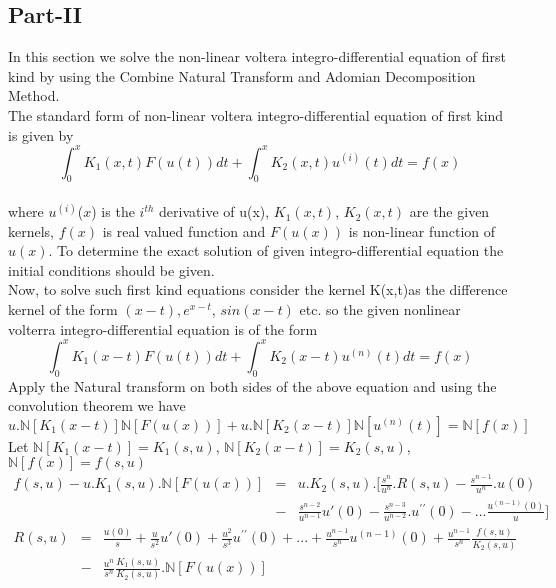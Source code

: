\subsection{Part-II}
        In this section we solve the non-linear voltera integro-differential equation of first kind by using the Combine Natural Transform and Adomian Decomposition Method.\\        
The standard form of non-linear voltera integro-differential equation of first kind is given by\cite{R92}
\begin{equation}
{\int_{0}^{x}K_{1}(x,t)F(u(t))dt + \int_{0}^{x}K_{2}(x,t)u^{(i)}(t)dt = f(x) }
\end{equation}\\
where  $u^{(i)}$($x$) is the $ i^{th}$ derivative of u(x), $K_{1}(x,t)$, $K_{2}(x,t)$ are the given kernels, $f(x)$ is real valued function and $F(u(x))$ is non-linear function of $u(x)$. To determine the exact solution of given integro-differential equation the initial conditions should be given.\\
Now, to solve such first kind equations consider the  kernel K(x,t)as the difference kernel of the form $(x-t),e^{x-t}$, $sin(x-t)$ etc. so the given nonlinear volterra integro-differential equation is of the form
\begin{equation}
{\int_{0}^{x}K_{1}(x-t)F(u(t))dt + \int_{0}^{x}K_{2}(x-t)u^{(n)}(t)dt = f(x) }
\end{equation}
Apply the Natural transform on both sides of the above equation and using the convolution theorem we have
\begin{equation*}
u.\mathbb{N}[K_{1}(x-t)] \mathbb{N}[F(u(x))] + u.\mathbb{N}[K_{2}(x-t)]\mathbb{N}[u^{(n)}(t)] = \mathbb{N}[f(x)]
\end{equation*}
Let $ \mathbb{N}[K_{1}(x-t)]=K_{1}(s,u)$, $\mathbb{N}[K_{2}(x-t)] = K_{2}(s,u)$, $\mathbb{N}[f(x)] = f(s,u)$
\begin{eqnarray*}
f(s,u) - u. K_{1}(s,u).\mathbb{N}[F(u(x))]&=& u.K_{2}(s,u).[\frac{s^{n}}{u^{n}}.R(s,u) - \frac{s^{n-1}}{u^{n}}.u(0) \\
&-&\frac{s^{n-2}}{u^{n-1}}u'(0)
-\frac{s^{n-3}}{u^{n-2}}.u^{\prime\prime}(0)
-...\frac{u^{(n-1)}(0)}{u}] 
\end{eqnarray*}
\begin{eqnarray*}
 R(s,u)& = &\frac{u(0)}{s} + \frac{u}{s^2}u'(0) + \frac{u^2}{s^3}u^{\prime\prime}(0) + ... +\frac{u^{n-1}}{s^n}u^{(n-1)}(0) + \frac{u^{n-1}}{s^n} \frac{f(s,u)}{K_{2}(s,u)}\\
&-&\frac{u^{n}}{s^n}\frac{K_{1}(s,u)}{K_{2}(s,u)}.\mathbb{N}[F(u(x))]
\end{eqnarray*}
